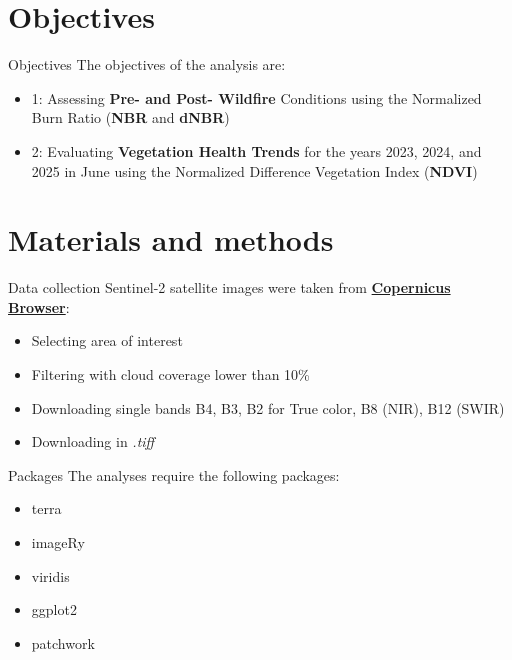\documentclass{beamer} %
\begin{document}
\section{Objectives} %

\begin{frame}{Objectives}
    The objectives of the analysis are:
    \bigskip
    \begin{itemize}
    \item    1: Assessing \textbf{Pre- and Post- Wildfire} Conditions using the Normalized Burn Ratio (\textbf{NBR} and \textbf{dNBR})

 \bigskip
    
    \item   2: Evaluating \textbf{Vegetation Health Trends}  for the years 2023, 2024, and 2025 in June using the Normalized Difference Vegetation Index (\textbf{NDVI}) 
    \end{itemize}
\end{frame}

\section{Materials and methods} %
\begin{frame}{Data collection}
    Sentinel-2 satellite images were taken from 
    \textbf{\href{https://browser.dataspace.copernicus.eu}{Copernicus Browser}}:
    \bigskip
    \begin{itemize}
        \item  Selecting area of interest
        \item  Filtering with cloud coverage lower than 10\%
        \item Downloading single bands B4, B3, B2 for True color, B8 (NIR), B12 (SWIR)
        \item Downloading in \textit{.tiff}
    \end{itemize}
\end{frame}

\begin{frame}{Packages} %
    The analyses require the following packages:
    \bigskip %
    \begin{itemize} %
        \item terra
        \item imageRy
        \item viridis
        \item ggplot2
        \item patchwork
    \end{itemize}
\end{frame}
\end{document}
